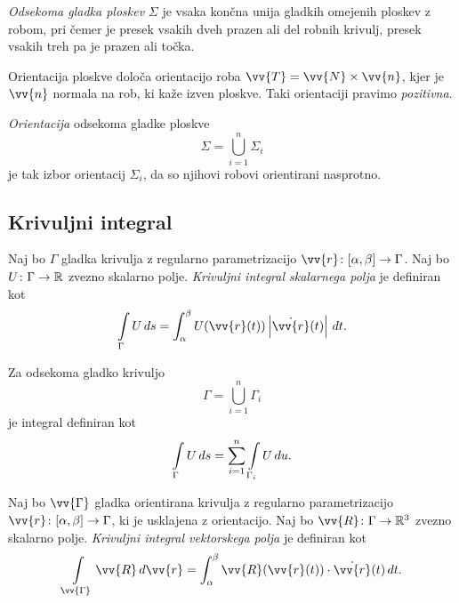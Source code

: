 \begin{definicija}
\emph{Odsekoma gladka ploskev}
$\Sigma$ je vsaka končna unija gladkih omejenih ploskev z robom,
pri čemer je presek vsakih dveh prazen ali del robnih krivulj,
presek vsakih treh pa je prazen ali točka.
\end{definicija}

\begin{opomba}
Orientacija ploskve določa orientacijo roba
$\vv{T} = \vv{N} \times \vv{n}$, kjer je $\vv{n}$ normala na rob,
ki kaže izven ploskve. Taki orientaciji pravimo \emph{pozitivna}.
\end{opomba}

\begin{definicija}
\emph{Orientacija} odsekoma gladke ploskve
\[
\Sigma = \bigcup_{i=1}^n \Sigma_i
\]
je tak izbor orientacij $\Sigma_i$, da so njihovi robovi
orientirani nasprotno.
\end{definicija}

\newpage

\subsection{Krivuljni integral}

\begin{definicija}
Naj bo $\Gamma$ gladka krivulja z regularno parametrizacijo
$\vv{r} \colon [\alpha, \beta] \to \Gamma$. Naj bo
$U \colon \Gamma \to \mathbb{R}$ zvezno skalarno polje.
\emph{Krivuljni integral skalarnega polja}
je definiran kot
\[
\lint_\Gamma U\,ds =
\int_\alpha^\beta U(\vv{r}(t)) \abs{\dot{\vv{r}}(t)}\,dt.
\]
\end{definicija}

\begin{opomba}
Za odsekoma gladko krivuljo
\[
\Gamma = \bigcup_{i=1}^n \Gamma_i
\]
je integral definiran kot
\[
\int\limits_\Gamma U\,ds =
\sum_{i=1}^n \int\limits_{\Gamma_i} U\,du.
\]
\end{opomba}

\begin{definicija}
Naj bo $\vv{\Gamma}$ gladka orientirana krivulja z regularno
parametrizacijo $\vv{r} \colon [\alpha, \beta] \to \Gamma$, ki je
usklajena z orientacijo. Naj bo $\vv{R} \colon \Gamma \to \R^3$
zvezno skalarno polje. \emph{Krivuljni integral vektorskega polja}
je definiran kot
\[
\lint_{\vv{\Gamma}} \vv{R}\,d\vv{r} =
\int_\alpha^\beta \vv{R}(\vv{r}(t)) \cdot \dot{\vv{r}}(t)\,dt.
\]
\end{definicija}

